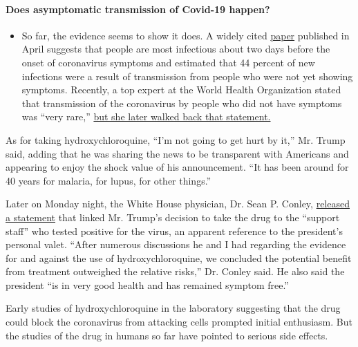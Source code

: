 \begin{itemize}
{  \paragraph{Does asymptomatic transmission of Covid-19
  happen?}\label{does-asymptomatic-transmission-of-covid-19-happen}}

  \begin{itemize}
  \tightlist
  \item
    So far, the evidence seems to show it does. A widely cited
    \href{https://www.nature.com/articles/s41591-020-0869-5}{paper}
    published in April suggests that people are most infectious about
    two days before the onset of coronavirus symptoms and estimated that
    44 percent of new infections were a result of transmission from
    people who were not yet showing symptoms. Recently, a top expert at
    the World Health Organization stated that transmission of the
    coronavirus by people who did not have symptoms was ``very rare,''
    \href{https://www.nytimes3xbfgragh.onion/2020/06/09/world/coronavirus-updates.html?action=click\&pgtype=Article\&state=default\&region=MAIN_CONTENT_3\&context=storylines_faq\#link-1f302e21}{but
    she later walked back that statement.}
  \end{itemize}
\end{itemize}

As for taking hydroxychloroquine, ``I'm not going to get hurt by it,''
Mr. Trump said, adding that he was sharing the news to be transparent
with Americans and appearing to enjoy the shock value of his
announcement. ``It has been around for 40 years for malaria, for lupus,
for other things.''

Later on Monday night, the White House physician, Dr. Sean P. Conley,
\href{https://int.graylady3jvrrxbe.onion/data/documenthelper/6959-letter-from-white-house-physic/e3e29d81b7d6339b9f56/optimized/full.pdf\#page=1}{released
a statement} that linked Mr. Trump's decision to take the drug to the
``support staff'' who tested positive for the virus, an apparent
reference to the president's personal valet. ``After numerous
discussions he and I had regarding the evidence for and against the use
of hydroxychloroquine, we concluded the potential benefit from treatment
outweighed the relative risks,'' Dr. Conley said. He also said the
president ``is in very good health and has remained symptom free.''

Early studies of hydroxychloroquine in the laboratory suggesting that
the drug could block the coronavirus from attacking cells prompted
initial enthusiasm. But the studies of the drug in humans so far have
pointed to serious side effects.

